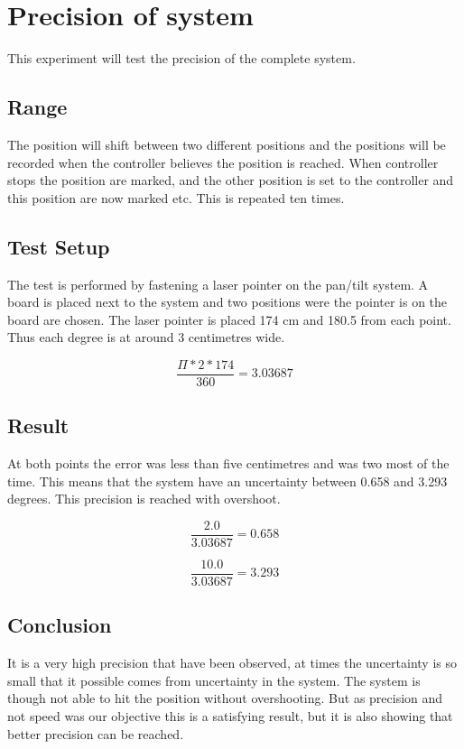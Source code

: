 \documentclass[11pt,a4paper]{report}
\begin{document}
\section{Precision of system}

This experiment will test the precision of the complete system. 

\subsection{Range}

The position will shift between two different positions and the positions will be recorded when the controller believes the position is reached. When controller stops the position are marked, and the other position is set to the controller and this position are now marked etc. This is repeated ten times.

\subsection{Test Setup}

The test is performed by fastening a laser pointer on the pan/tilt system. A board is placed next to the system and two positions were the pointer is on the board are chosen. The laser pointer is placed 174 cm and 180.5 from each point. Thus each degree is at around 3 centimetres wide.

\[ \frac{\Pi*2*174}{360} = 3.03687 \]


\subsection{Result}

At both points the error was less than five centimetres and was two most of the time. This means that the system have an uncertainty between 0.658 and 3.293 degrees. This precision is reached with overshoot.

\[ \frac{2.0}{3.03687} = 0.658 \]

\[ \frac{10.0}{3.03687} = 3.293 \]

\subsection{Conclusion}

It is a very high precision that have been observed, at times the uncertainty is so small that it possible comes from uncertainty in the system. The system is though not able to hit the position without overshooting. But as precision and not speed was our objective this is a satisfying result, but it is also showing that better precision can be reached. 
\end{document}
